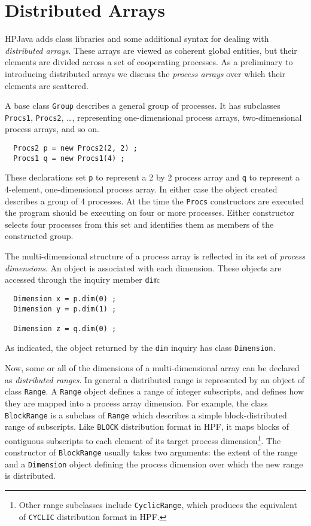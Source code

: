 \section{Distributed Arrays\label{distArrays}}

HPJava adds class libraries and some additional syntax for dealing
with {\em distributed arrays}.  These arrays are viewed as
coherent global entities, but their elements are divided
across a set of cooperating processes.  As a preliminary to
introducing distributed arrays we discuss the {\em process arrays} over
which their elements are scattered.

A base class {\tt Group} describes a general group of processes.
It has subclasses {\tt Procs1}, {\tt Procs2}, \ldots, representing
one-dimensional process arrays, two-dimen\-sional process arrays, 
and so on.
\small
\begin{verbatim}
  Procs2 p = new Procs2(2, 2) ;
  Procs1 q = new Procs1(4) ;
\end{verbatim}
\normalsize
These declarations set {\tt p} to represent a 2 by 2 process array and {\tt q}
to represent a 4-element, one-dimensional process array.  In either case
the object created describes a group of 4 processes.
At the time the {\tt Procs} constructors are executed the program should be
executing on four or more processes.  Either constructor selects four
processes from this set and identifies them as members of
the constructed group.

The multi-dimensional structure of a process array is reflected in
its set of {\em process dimensions}.  An object is associated
with each dimension.  These objects are accessed through the
inquiry member {\tt dim}:
\small
\begin{verbatim}
  Dimension x = p.dim(0) ;
  Dimension y = p.dim(1) ;

  Dimension z = q.dim(0) ;
\end{verbatim}
\normalsize
As indicated, the object returned by the {\tt dim} inquiry has class
{\tt Dimension}.

Now, some or all of the dimensions of a multi-dimensional array can be
declared as {\em distributed ranges}.  In general a distributed
range is represented by an object of class {\tt Range}.  A {\tt Range}
object defines a range of integer subscripts, and defines how they are mapped
into a process array dimension.
For example, the class {\tt BlockRange} is a subclass of {\tt Range}
which describes a simple block-distributed range of subscripts.  Like
{\tt BLOCK} distribution format in HPF, it maps blocks of contiguous
subscripts to each element of its target process
dimension\footnote{Other range subclasses include {\tt CyclicRange},
which produces the equivalent of {\tt CYCLIC} distribution format in
HPF.}.  The constructor of {\tt BlockRange} usually takes two
arguments: the extent of the range and a {\tt Dimension} object
defining the process dimension over which the new range is
distributed.

